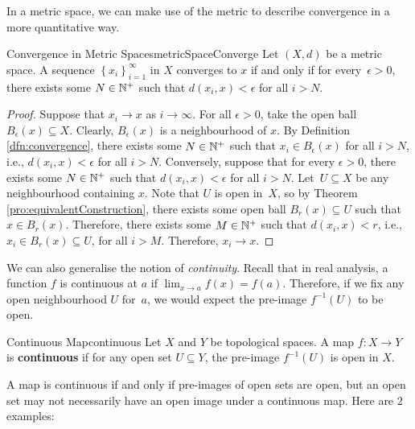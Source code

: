 \documentclass[math]{amznotes}
\theoremstyle{remark}
\begin{document}
In a metric space, we can make use of the metric to describe convergence in a more quantitative way.
\begin{thmbox}{Convergence in Metric Spaces}{metricSpaceConverge}
    Let $\left(X, d\right)$ be a metric space. A sequence $\left\{x_i\right\}_{i = 1}^{\infty}$ in $X$ converges to $x$ if and only if for every~$\epsilon > 0$, there exists some $N \in \mathbb{N}^+$ such that $d\left(x_i, x\right) < \epsilon$ for all $i > N$.
    \tcblower
    \begin{proof}
        Suppose that $x_i \to x$ as $i \to \infty$. For all $\epsilon > 0$, take the open ball $B_{\epsilon}\left(x\right) \subseteq X$. Clearly, $B_{\epsilon}\left(x\right)$ is a neighbourhood of $x$. By Definition \ref{dfn:convergence}, there exists some $N \in \mathbb{N}^+$ such that $x_i \in B_{\epsilon}\left(x\right)$ for all $i > N$, i.e., $d\left(x_i, x\right) < \epsilon$ for all $i > N$. Conversely, suppose that for every $\epsilon > 0$, there exists some $N \in \mathbb{N}^+$ such that $d\left(x_i, x\right) < \epsilon$ for all $i > N$. Let~$U \subseteq X$ be any neighbourhood containing $x$. Note that $U$ is open in~$X$, so by Theorem \ref{pro:equivalentConstruction}, there exists some open ball $B_r\left(x\right) \subseteq U$ such that $x \in B_r\left(x\right)$. Therefore, there exists some $M \in \mathbb{N}^+$ such that $d\left(x_i, x\right) < r$, i.e., $x_i \in B_r\left(x\right) \subseteq U$, for all $i > M$. Therefore, $x_i \to x$.
    \end{proof}
\end{thmbox}
We can also generalise the notion of \textit{continuity}. Recall that in real analysis, a function $f$ is continuous at $a$ if $\lim_{x \to a}f\left(x\right) = f\left(a\right)$. Therefore, if we fix any open neighbourhood $U$ for~$a$, we would expect the pre-image $f^{-1}\left(U\right)$ to be open.
\begin{dfnbox}{Continuous Map}{continuous}
    Let $X$ and $Y$ be topological spaces. A map $f \colon X \to Y$ is {\color{red} \textbf{continuous}} if for any open set $U \subseteq Y$, the pre-image $f^{-1}\left(U\right)$ is open in $X$.
\end{dfnbox}
A map is continuous if and only if pre-images of open sets are open, but an open set may not necessarily have an open image under a continuous map. Here are $2$ examples:
\end{document}

